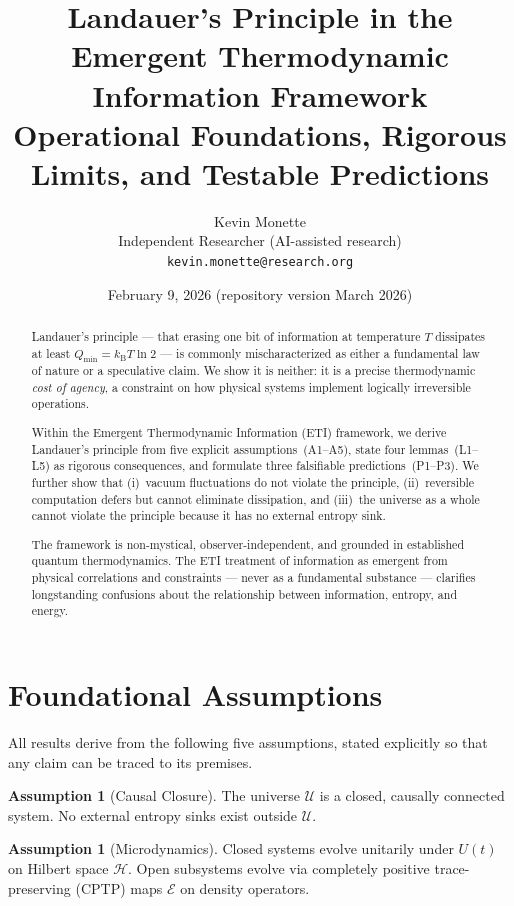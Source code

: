 \documentclass[12pt,letterpaper]{article}
\title{\textbf{Landauer's Principle in the Emergent Thermodynamic Information Framework}\\[4pt]
\large Operational Foundations, Rigorous Limits, and Testable Predictions}
\author{Kevin Monette\\[2pt]
\small Independent Researcher (AI-assisted research)\\
\small \texttt{kevin.monette@research.org}}
\date{February 9, 2026 \quad (repository version March 2026)}
\theoremstyle{plain}
\theoremstyle{definition}
\newtheorem{assumption}[theorem]{Assumption}
\theoremstyle{remark}
\newcommand{\kB}{k_{\mathrm{B}}}
\newcommand{\lnTwo}{\ln 2}
\newcommand{\Qmin}{Q_{\min}}
\begin{document}
\maketitle

\begin{abstract}
Landauer's principle --- that erasing one bit of information at temperature $T$ dissipates at
least $\Qmin = \kB T \lnTwo$ --- is commonly mischaracterized as either a fundamental law of
nature or a speculative claim.  We show it is neither: it is a precise thermodynamic
\emph{cost of agency}, a constraint on how physical systems implement logically irreversible
operations.

Within the Emergent Thermodynamic Information (ETI) framework, we derive Landauer's principle
from five explicit assumptions~(A1--A5), state four lemmas~(L1--L5) as rigorous consequences,
and formulate three falsifiable predictions~(P1--P3).  We further show that (i)~vacuum
fluctuations do not violate the principle, (ii)~reversible computation defers but cannot
eliminate dissipation, and (iii)~the universe as a whole cannot violate the principle because it
has no external entropy sink.

The framework is non-mystical, observer-independent, and grounded in established quantum
thermodynamics.  The ETI treatment of information as emergent from physical correlations and
constraints --- never as a fundamental substance --- clarifies longstanding confusions about the
relationship between information, entropy, and energy.
\end{abstract}

\tableofcontents
\bigskip

\section{Foundational Assumptions}
\label{sec:assumptions}

All results derive from the following five assumptions, stated explicitly so that any claim can
be traced to its premises.

\begin{assumption}[Causal Closure]\label{ass:A1}
The universe $\mathcal{U}$ is a closed, causally connected system.  No external entropy sinks
exist outside $\mathcal{U}$.
\end{assumption}

\begin{assumption}[Microdynamics]\label{ass:A2}
Closed systems evolve unitarily under $U(t)$ on Hilbert space $\mathcal{H}$.  Open subsystems
evolve via completely positive trace-preserving (CPTP) maps $\mathcal{E}$ on density operators.
\end{assumption}
\end{document}
